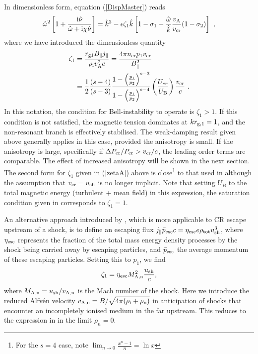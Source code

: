 \documentclass[a4paper,fleqn,usenatbib]{mnras}
\newcommand{\eqb}{\begin{eqnarray}}
\newcommand{\eqe}{\end{eqnarray}}
\begin{document}
In dimensionless form, equation (\ref{DispMaster}) reads
\eqb
\label{DispDimensionless}
\hat{\omega}^2 \left[1+\frac{{\rm i} \hat{\nu}}{\hat{\omega}+{\rm i}\chi \hat{ \nu}}
\right]= \hat{k}^2  - \epsilon \zeta_1 \hat{k} \left[1-\sigma_1 - \frac{\hat{\omega}}{\hat{k}} \frac{v_{\rm A}}{v_{\rm cr}}(1-\sigma_2)\right]~,
\eqe
where 
we have introduced the dimensionless quantity
\begin{align}
\zeta_1 &= \frac{r_{\rm g1} B_\| j_\|}{\rho_{\rm i} v_{\rm A}^2 c} =
\frac{4 \pi n_{\rm cr} p_1 v_{\rm cr}}{B_\|^2} \nonumber \\
&=\frac{1}{2}\frac{(s-4)}{(s-3)}
\frac{1-\left(\frac{p_1}{p_2} \right)^{s-3}}{1-\left(\frac{p_1}{p_2} \right)^{s-4}}\left(\frac{U_{cr}}{U_{\rm B}}\right) \frac{v_{\rm cr}}{c} ~.
\label{zetaA}
\end{align}
In this notation, the condition for Bell-instability to operate is $\zeta_1>1$. If this condition is not satisfied, the magnetic tension dominates at $k r_{\rm g,1} = 1$, and the non-resonant branch is effectively stabilised. The weak-damping result given above generally applies in this case, provided the anisotropy is  
small. If the anisotropy is large, specifically if $\Delta P_{\rm cr}/ P_{\rm cr} > v_{\rm cr}/{c}$, the leading order terms are comparable. The effect of increased anisotropy will be shown in the next section.
The second form for $\zeta_1$ given in (\ref{zetaA}) above is close\footnote{
For the  $s=4$ case, note $\lim_{n\rightarrow 0} \frac{x^{n}-1}{n} = \ln x$ } to that used in \cite{Bell04} although the assumption that $v_{\rm  cr} = u_{\rm sh}$ is no longer implicit. Note that setting $U_B$ to the total magnetic energy (turbulent + mean field) in this expression, the saturation condition given in \cite{Bell04} corresponds to $\zeta_1=1$.  


An alternative approach introduced by \cite{Bell13}, which is more applicable to CR escape upstream of a shock, is to define an escaping flux $j_{\|} \bar{p}_{\rm esc} c =  \eta_{\rm esc} e \rho_{\rm tot} u_{\rm sh}^3$, where $\eta_{\rm esc}$ represents the fraction of the total mass energy density processes by the shock being carried away by escaping particles, and $\bar{p}_{\rm esc}$ the average momentum of these escaping particles. Setting this to $p_1$, we find 
\eqb
\label{zeta3}
\zeta_1 = \eta_{\rm esc} M_{\rm A,n}^2 \frac{u_{\rm sh}}{c} ,
\eqe
where $M_{\rm A,n} = u_{\rm sh}/v_{\rm A,n}$ is the Mach number of the shock. Here we introduce the reduced Alfv\'en velocity $v_{\rm A,n} = B/\sqrt{4 \pi (\rho_{\rm i}+\rho_{\rm n})}$ in anticipation of shocks that encounter an incompletely ionised medium in the far upstream. This reduces to the expression in \cite{Bell13} in the limit $\rho_n = 0$. 
\end{document}
